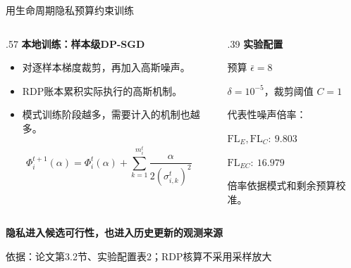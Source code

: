 \documentclass[aspectratio=169,11pt]{beamer}
\newcommand{\FlE}{\mathrm{FL}_{E}}
\newcommand{\FlEC}{\mathrm{FL}_{EC}}
\newcommand{\FlC}{\mathrm{FL}_{C}}
\newcommand{\key}[1]{{\color{Teal}\bfseries #1}}
\newcommand{\src}[1]{\vfill{\color{Gray}\fontsize{7.5}{9}\selectfont 依据：#1\par}}
\newcommand{\msg}[1]{\par\vspace{.14cm}{\color{Teal}\rule{.32cm}{1.5pt}}\hspace{.18cm}\textbf{#1}\par}
\newcommand{\tight}{\setlength{\itemsep}{.18cm}}
\begin{document}
\begin{frame}{用生命周期隐私预算约束训练}
\begin{columns}[T,onlytextwidth]
\begin{column}{.57\textwidth}
\textbf{本地训练：样本级DP-SGD}
\begin{itemize}\tight
\item 对逐样本梯度裁剪，再加入高斯噪声。
\item RDP账本累积实际执行的高斯机制。
\item 模式训练阶段越多，需要计入的机制也越多。
\end{itemize}
\par\vspace{.25cm}
\[
\Phi_i^{t+1}(\alpha)=
\Phi_i^t(\alpha)+
\sum_{k=1}^{m_i^t}
\frac{\alpha}{2(\sigma_{i,k}^t)^2}
\]
\end{column}
\begin{column}{.39\textwidth}
\key{实验配置}\par\vspace{.2cm}
预算 $\bar\epsilon=8$\par
$\delta=10^{-5}$，裁剪阈值 $C=1$\par\vspace{.25cm}
代表性噪声倍率：\par
$\FlE,\FlC:\ 9.803$\par
$\FlEC:\ 16.979$\par\vspace{.25cm}
倍率依据模式和剩余预算校准。
\end{column}
\end{columns}
\msg{隐私进入候选可行性，也进入历史更新的观测来源}
\src{论文第3.2节、实验配置表2；RDP核算不采用采样放大}
\end{frame}
\end{document}

